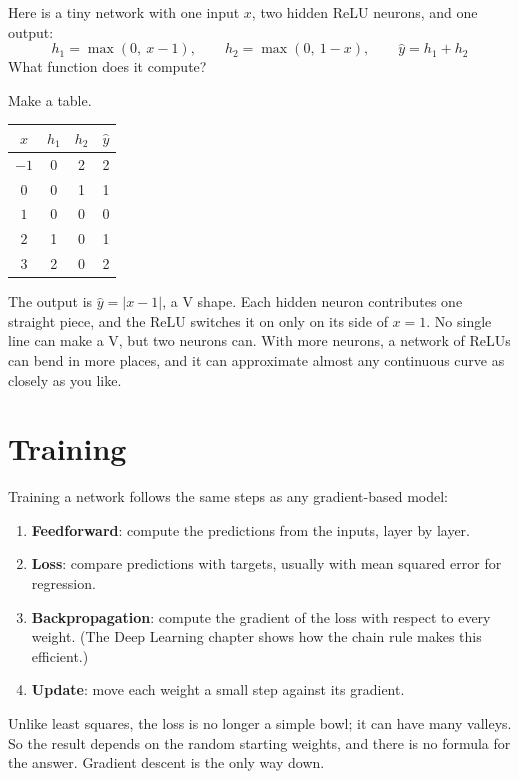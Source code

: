 \begin{Worked}
\begin{Problem}
Here is a tiny network with one input $x$, two hidden ReLU neurons, and one output:
$$h_1 = \max(0,\ x - 1), \qquad h_2 = \max(0,\ 1 - x), \qquad \hat{y} = h_1 + h_2$$
What function does it compute?
\end{Problem}
\begin{Solution}
Make a table.
\begin{center}
\begin{tabular}{c|c|c|c}
$x$ & $h_1$ & $h_2$ & $\hat{y}$ \\
\hline
$-1$ & 0 & 2 & 2 \\
$0$ & 0 & 1 & 1 \\
$1$ & 0 & 0 & 0 \\
$2$ & 1 & 0 & 1 \\
$3$ & 2 & 0 & 2 \\
\end{tabular}
\end{center}
The output is $\hat{y} = |x - 1|$, a V shape. Each hidden neuron contributes one straight piece, and the ReLU
switches it on only on its side of $x = 1$. No single line can make a V, but two neurons can. With more neurons, a
network of ReLUs can bend in more places, and it can approximate almost any continuous curve as closely as you
like.
\end{Solution}
\end{Worked}

\section{Training}
Training a network follows the same steps as any gradient-based model:
\begin{enumerate}
\item \textbf{Feedforward}: compute the predictions from the inputs, layer by layer.
\item \textbf{Loss}: compare predictions with targets, usually with mean squared error for regression.
\item \textbf{Backpropagation}: compute the gradient of the loss with respect to every weight. (The Deep Learning
chapter shows how the chain rule makes this efficient.)
\item \textbf{Update}: move each weight a small step against its gradient.
\end{enumerate}
Unlike least squares, the loss is no longer a simple bowl; it can have many valleys. So the result depends on the
random starting weights, and there is no formula for the answer. Gradient descent is the only way down.

